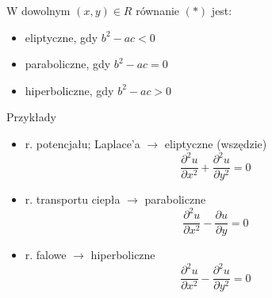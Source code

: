 \begin{frame}
  W dowolnym $(x,y) \in R$ równanie $(*)$ jest:
  \begin{itemize}
    \item eliptyczne, gdy $b^2 - ac < 0$
    \item paraboliczne, gdy $b^2 - ac = 0$
    \item hiperboliczne, gdy $b^2 - ac > 0$
  \end{itemize}
\end{frame}

\begin{frame}
  \begin{exampleblock}{Przykłady}
      \begin{itemize}
        \item r. potencjału; Laplace'a $\rightarrow$ eliptyczne (wszędzie)
        $$\frac{{\partial}^2u}{{\partial}x^2} + \frac{{\partial}^2u}{{\partial}y^2} = 0$$

        \item r. transportu ciepła $\rightarrow$ paraboliczne
        $$\frac{{\partial}^2u}{{\partial}x^2} - \frac{{\partial}u}{{\partial}y} = 0$$

        \item r. falowe $\rightarrow$ hiperboliczne
        $$\frac{{\partial}^2u}{{\partial}x^2} - \frac{{\partial}^2u}{{\partial}y^2} = 0$$
      \end{itemize}
  \end{exampleblock}
\end{frame}
